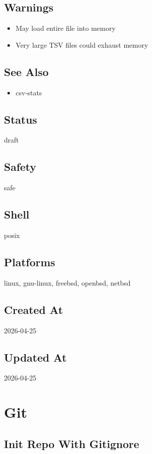 \documentclass[openany]{book}
\begin{document}
\section*{Warnings}
\begin{itemize}
  \item May load entire file into memory
  \item Very large TSV files could exhaust memory
\end{itemize}

\section*{See Also}
\begin{itemize}
  \item csv-stats
\end{itemize}

\section*{Status}
draft

\section*{Safety}
safe

\section*{Shell}
posix

\section*{Platforms}
linux, gnu-linux, freebsd, openbsd, netbsd

\section*{Created At}
2026-04-25

\section*{Updated At}
2026-04-25

\chapter{Git}

\section{Init Repo With Gitignore}
\end{document}

